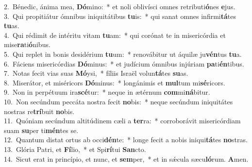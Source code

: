 {2.~}Bénedic, ánima mea, \textbf{Dó}mino:~* et noli oblivísci omnes retributi\textbf{ó}nes \textbf{e}jus.\\
{3.~}Qui propitiátur ómnibus iniquitátibus \textbf{tu}is:~* qui sanat omnes infirmi\textbf{tá}tes \textbf{tu}as.\\
{4.~}Qui rédimit de intéritu vitam \textbf{tu}am:~* qui corónat te in misericórdia et mise\textbf{ra}ti\textbf{ó}nibus.\\
{5.~}Qui replet in bonis desidérium \textbf{tu}um:~* renovábitur ut áquilæ ju\textbf{vén}tus \textbf{tu}a.\\
{6.~}Fáciens misericórdias \textbf{Dó}minus:~* et judícium ómnibus injúriam \textbf{pa}ti\textbf{én}tibus.\\
{7.~}Notas fecit vias suas \textbf{Mó}ysi,~* fíliis Israël volun\textbf{tá}tes \textbf{su}as.\\
{8.~}Miserátor, et miséricors \textbf{Dó}minus:~* longánimis et \textbf{mul}tum mi\textbf{sé}ricors.\\
{9.~}Non in perpétuum ira\textbf{scé}tur:~* neque in ætérnum \textbf{com}mi\textbf{ná}bitur.\\
{10.~}Non secúndum peccáta nostra fecit \textbf{no}bis:~* neque secúndum iniquitátes nostras re\textbf{trí}buit \textbf{no}bis.\\
{11.~}Quóniam secúndum altitúdinem cæli a \textbf{ter}ra:~* corroborávit misericórdiam suam \textbf{su}per ti\textbf{mén}tes se.\\
{12.~}Quantum distat ortus ab occi\textbf{dén}te:~* longe fecit a nobis iniqui\textbf{tá}tes \textbf{no}stras.\\
{13.~}Glória Patri, et \textbf{Fí}lio,~* et Spi\textbf{rí}tui \textbf{San}cto.\\
{14.~}Sicut erat in princípio, et nunc, et \textbf{sem}per,~* et in sǽcula sæcu\textbf{ló}rum. \textbf{A}men.\\
